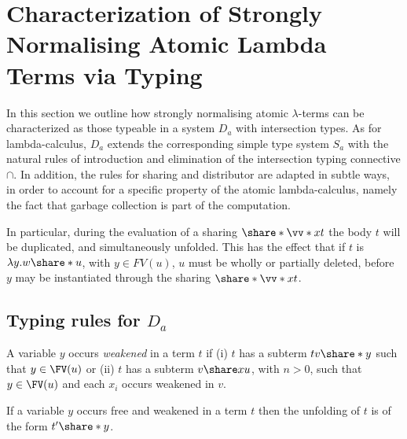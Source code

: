 \section{Characterization of Strongly Normalising Atomic Lambda Terms via Typing}
\label{sec:SND}

In this section we outline how  strongly normalising atomic $\lambda$-terms can be characterized as those typeable in a system $D_a$ with intersection types.
%
As for lambda-calculus, $D_a$ extends the corresponding simple type system $S_a$ with the natural rules of introduction and elimination of the intersection typing connective $\cap$.
%
In addition, the rules for sharing and distributor are adapted in subtle ways, in order to account for a specific property of the atomic lambda-calculus, namely the fact that garbage collection is part of the computation.



In particular, during the evaluation of a sharing $\share*{\vv*x}t$ the body $t$ will be duplicated, and simultaneously unfolded.
%
%
This has the effect that if  $t$ is $\lambda y.w\share*{}u$, with $y \in FV(u)$, $u$ must be wholly or partially deleted, before $y$ may be instantiated through the sharing $\share*{\vv*x}t$.




\subsection{Typing rules for $D_a$}


\begin{ALdefinition}
A variable $y$ occurs \emph{weakened} in a term $t$ if (i) $t$ has a subterm $tv\share*{}y$ such that $y\in\FV(u)$ or 
(ii) $t$ has a subterm $v\share xu$, with $n>0$, such that $y\in\FV(u)$ and each $x_i$ occurs weakened in $v$.
\end{ALdefinition}


\begin{ALlemma}
\label{lem:unfolding weakened variable}
If a variable $y$ occurs free and weakened in a term $t$ then the unfolding of $t$ is of the form $t'\share*{}y$.
\end{ALlemma}

